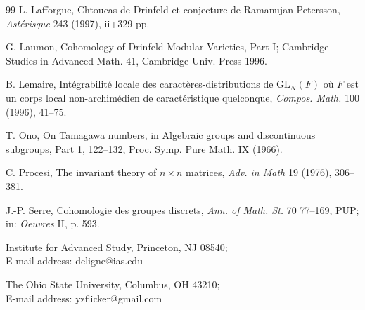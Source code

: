 \documentclass[11pt,a4paper]{article}
\theoremstyle{plain}
\theoremstyle{definition}
\newcommand{\GL}{\mathrm{GL}}
\begin{document}
\begin{thebibliography}{99}
 L. Lafforgue, Chtoucas de Drinfeld et conjecture de Ramanujan-Petersson, \textit{Ast\'erisque} 243 (1997), ii+329 pp.

 G. Laumon, Cohomology of Drinfeld Modular Varieties, Part I; Cambridge Studies in Advanced Math. 41, Cambridge Univ. Press 1996.

 B. Lemaire, Int\'egrabilit\'e locale des caract\`eres-distributions de $\GL_N(F)$ o\`u $F$ est un corps local non-archim\'edien de caract\'eristique quelconque, \textit{Compos. Math.} 100 (1996), 41--75.

 T. Ono, On Tamagawa numbers, in Algebraic groups and discontinuous subgroups, Part 1, 122--132, Proc. Symp. Pure Math. IX (1966).

 C. Procesi, The invariant theory of $n \times n$ matrices, \textit{Adv. in Math} 19 (1976), 306--381.

 J.-P. Serre, Cohomologie des groupes discrets, \textit{Ann. of Math. St.} 70 77--169, PUP; in: \textit{Oeuvres} II, p. 593.

\end{thebibliography}

\bigskip
\noindent
Institute for Advanced Study, Princeton, NJ 08540;\\
E-mail address: deligne@ias.edu

\bigskip
\noindent
The Ohio State University, Columbus, OH 43210;\\
E-mail address: yzflicker@gmail.com
\end{document}
